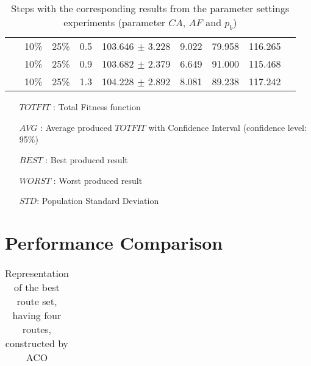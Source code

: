 \begin{table}
\begin{tabular}{|l|l|l|c||c|c|c|c|c|}
    ~ & 10\% & 25\% & 0.5 & 103.646 $\pm$ 3.228 & 9.022 & 79.958 & 116.265\\
    ~ & 10\% & 25\% & 0.9 & 103.682 $\pm$ 2.379 & 6.649 & 91.000 & 115.468\\
    ~ & 10\% & 25\% & 1.3 & 104.228 $\pm$ 2.892 & 8.081 & 89.238 & 117.242\\
    \hline
    \end{tabular}
    \caption {Steps with the corresponding results from the parameter settings experiments (parameter $CA$, $AF$ and $p_b$)}
    \tiny
    \begin{itemize}[noitemsep]
    \item[$TOTFIT$ :] Total Fitness function
    \item[$AVG$ :] Average produced $TOTFIT$ with Confidence Interval (confidence level: 95\%)
    \item[$BEST$ :] Best produced result
    \item[$WORST$ :] Worst produced result
    \item[$STD$:] Population Standard Deviation 
    \end{itemize}
    \label{table:pm2}
\end{table}


\section{Performance Comparison}

\begin{table}[H]
    \centering
    \begin{tabular}{|l|llllllll|}
    \hline
    \hline
    \end{tabular}
    \caption {Representation of the best route set, having four routes, constructed by ACO}
    \label{table:performanceComparison_bestRouteSet4_ACO}
\end{table}

